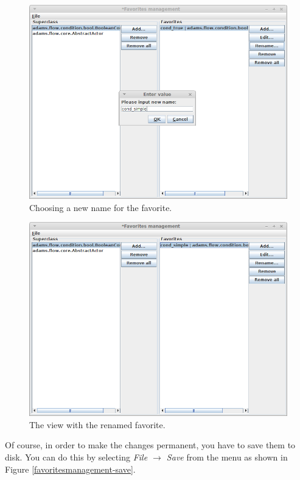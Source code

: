 \begin{figure}[htb]
  \centering
  \includegraphics[width=12.0cm]{images/favoritesmanagement-rename1.png}
  \caption{Choosing a new name for the favorite.}
  \label{favoritesmanagement-rename1}
\end{figure}

\begin{figure}[htb]
  \centering
  \includegraphics[width=12.0cm]{images/favoritesmanagement-rename2.png}
  \caption{The view with the renamed favorite.}
  \label{favoritesmanagement-rename2}
\end{figure}

\clearpage
{}
Of course, in order to make the changes permanent, you have to save them to 
disk. You can do this by selecting \textit{File $\rightarrow$ Save} from the
menu as shown in Figure \ref{favoritesmanagement-save}.


